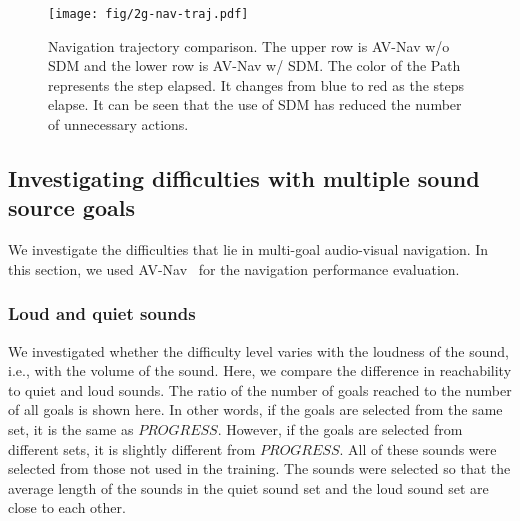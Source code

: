 \begin{figure*}[t]
    \begin{center}
        \centering
        \texttt{[image: fig/2g-nav-traj.pdf]}
        \caption{
            Navigation trajectory comparison.
            The upper row is AV-Nav w/o SDM and the lower row is AV-Nav w/ SDM.
            The color of the Path represents the step elapsed.
            It changes from blue to red as the steps elapse.
            It can be seen that the use of SDM has reduced the number of unnecessary actions.
        }
        \label{fig:qualitative_eval}
    \end{center}
\end{figure*}



\subsection{Investigating difficulties with multiple sound source goals}
\label{invest_difficulties}

We investigate the difficulties that lie in multi-goal audio-visual navigation.
In this section, we used AV-Nav~\cite{chen2020soundspaces} for the navigation performance evaluation.

\subsubsection{Loud and quiet sounds}

We investigated whether the difficulty level varies with the loudness of the sound, i.e., with the volume of the sound.
Here, we compare the difference in reachability to quiet and loud sounds.
The ratio of the number of goals reached to the number of all goals is shown here. In other words, if the goals are selected from the same set, it is the same as $PROGRESS$. However, if the goals are selected from different sets, it is slightly different from $PROGRESS$.
All of these sounds were selected from those not used in the training.
The sounds were selected so that the average length of the sounds in the quiet sound set and the loud sound set are close to each other.

